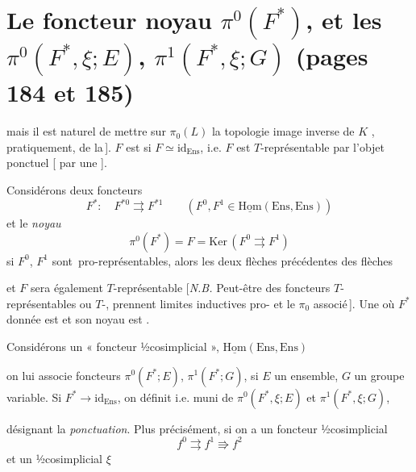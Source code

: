 \documentclass[11pt,a4paper]{article}
\begin{document}
\section*{Le foncteur noyau $\pi^0(F^{*})$, et les $\pi^0(F^{*},\xi;E)$, $\pi^1(F^{*},\xi;G)$ (pages 184 et 185)}


mais il est naturel de mettre sur $\pi_0(L)$ la topologie image inverse de
 $K$ ,
pratiquement, \ill{} de la\,]. $F$ est \ill{}  si
$F \simeq \mathrm{id}_{\mathrm{Ens}}$, i.e. $F$ est $T$-représentable par
l'objet ponctuel [\ill{} par une \ill{} \ill{}].

Considérons  deux foncteurs \ill{}
\[
  F^{*} : \quad F^{*0} \rightrightarrows F^{*1}
  \qquad (F^0, F^1 \in \underline{\mathrm{Hom}}(\mathrm{Ens}, \mathrm{Ens}))
\]
et le  \emph{noyau}
\[
  \pi^0(F^{*}) = F = \mathrm{Ker}\,(F^0 \rightrightarrows F^1)
\]
si $F^0$, $F^1$ sont  \,pro-représentables, alors
les deux flèches précédentes \ill{} des flèches


et $F$ sera également $T$-représentable [\emph{N.B.} Peut-être \ill{} des
foncteurs $T$-représentables ou $T$-, \ill{} prennent \ill{}
limites inductives \ill{} \ill{} pro-\ill{} et le $\pi_0$ associé\,]. Une \ill{}
où $F^{*}$ \ill{} donnée est \ill{} et \ill{} son noyau est
.

Considérons un « foncteur ½cosimplicial », 
$\underline{\mathrm{Hom}}(\mathrm{Ens}, \mathrm{Ens})$


on lui associe \ill{} foncteurs $\pi^0(F^{*}; E)$, $\pi^1(F^{*}; G)$, si $E$ un
ensemble, $G$ un groupe variable. Si $F^{*} \to \mathrm{id}_{\mathrm{Ens}}$, on
définit \struck{\ill{}} i.e. muni de $\pi^0(F^{*}, \xi; E)$ et
$\pi^1(F^{*}, \xi; G)$,


désignant la \emph{ponctuation}. Plus précisément, si on a \ill{} un \ill{}
foncteur ½cosimplicial
\[
  f^0 \rightrightarrows f^1 \Rrightarrow f^2
\]
\struck{\ill{}} et un  ½cosimplicial $\xi$
\end{document}
